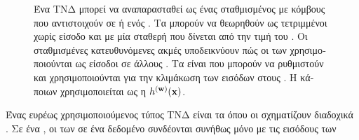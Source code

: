 {{\begin{figure}[H]
 		{
		\caption{\foreignlanguage{greek}{Ένα ΤΝΔ μπορεί να αναπαρασταθεί ως ένας σταθμισμένος}  
			\foreignlanguage{greek}{με κόμβους που αντιστοιχούν σε}  \foreignlanguage{greek}{ή}  
			\foreignlanguage{greek}{ενός} . \foreignlanguage{greek}{Τα}  \foreignlanguage{greek}{μπορούν 
			να θεωρηθούν ως τετριμμένοι}  \foreignlanguage{greek}{χωρίς είσοδο και με μία σταθερή}  
			\foreignlanguage{greek}{που δίνεται από την τιμή} \foreignlanguage{greek}{του} . \foreignlanguage{greek}{Οι 
			σταθμισμένες κατευθυνόμενες ακμές υποδεικνύουν πώς οι}  \foreignlanguage{greek}{των}  
			\foreignlanguage{greek}{χρησιμοποιούνται ως είσοδοι σε άλλους} . \foreignlanguage{greek}{Τα} 
			 \foreignlanguage{greek}{είναι}  \foreignlanguage{greek}{που 
			μπορούν να ρυθμιστούν και χρησιμοποιούνται για την κλιμάκωση των εισόδων στους} . 
			\foreignlanguage{greek}{Η}  \foreignlanguage{greek}{κάποιων}  
			\foreignlanguage{greek}{χρησιμοποιείται ως η}  
			$h^{({\bf w})}({\bf x})$. \label{fig_ANN_DAG_dict}} }
 		\end{figure}
		\foreignlanguage{greek}{Ένας ευρέως χρησιμοποιούμενος τύπος ΤΝΔ είναι τα}  \foreignlanguage{greek}{όπου 
		οι}  \foreignlanguage{greek}{σχηματίζουν διαδοχικά} . \foreignlanguage{greek}{Σε ένα} 
		, \foreignlanguage{greek}{οι}  \foreignlanguage{greek}{των}  
		\foreignlanguage{greek}{σε ένα δεδομένο}  \foreignlanguage{greek}{συνδέονται συνήθως μόνο με τις εισόδους των} 
}}
